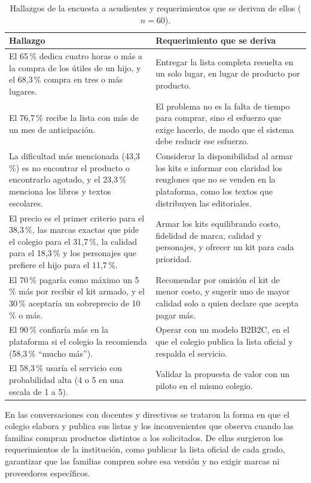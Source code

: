 \begin{table}[H]
\centering\footnotesize
\setlength{\tabcolsep}{4pt}
\renewcommand{\arraystretch}{1.25}
\caption{Hallazgos de la encuesta a acudientes y requerimientos que se derivan de ellos
($n=60$).}
\label{tab:encuesta-requerimientos}
\begin{tabularx}{\textwidth}{@{}XX@{}}
\toprule
\textbf{Hallazgo} & \textbf{Requerimiento que se deriva} \\
\midrule
El 65\,\% dedica cuatro horas o más a la compra de los útiles de un hijo, y el 68,3\,\%
compra en tres o más lugares. &
Entregar la lista completa resuelta en un solo lugar, en lugar de producto por producto. \\
El 76,7\,\% recibe la lista con más de un mes de anticipación. &
El problema no es la falta de tiempo para comprar, sino el esfuerzo que exige hacerlo, de
modo que el sistema debe reducir ese esfuerzo. \\
La dificultad más mencionada (43,3\,\%) es no encontrar el producto o encontrarlo agotado, y
el 23,3\,\% menciona los libros y textos escolares. &
Considerar la disponibilidad al armar los kits e informar con claridad los renglones que no
se venden en la plataforma, como los textos que distribuyen las editoriales. \\
El precio es el primer criterio para el 38,3\,\%, las marcas exactas que pide el colegio
para el 31,7\,\%, la calidad para el 18,3\,\% y los personajes que prefiere el hijo para el
11,7\,\%. &
Armar los kits equilibrando costo, fidelidad de marca, calidad y personajes, y ofrecer un
kit para cada prioridad. \\
El 70\,\% pagaría como máximo un 5\,\% más por recibir el kit armado, y el 30\,\% aceptaría
un sobreprecio de 10\,\% o más. &
Recomendar por omisión el kit de menor costo, y sugerir uno de mayor calidad solo a quien
declare que acepta pagar más. \\
El 90\,\% confiaría más en la plataforma si el colegio la recomienda (58,3\,\% ``mucho
más''). &
Operar con un modelo B2B2C, en el que el colegio publica la lista oficial y respalda el
servicio. \\
El 58,3\,\% usaría el servicio con probabilidad alta (4 o 5 en una escala de 1 a 5). &
Validar la propuesta de valor con un piloto en el mismo colegio. \\
\bottomrule
\end{tabularx}
\end{table}

En las conversaciones con docentes y directivos se trataron la forma en que el colegio
elabora y publica sus listas y los inconvenientes que observa cuando las familias compran
productos distintos a los solicitados. De ellas surgieron los requerimientos de la
institución, como publicar la lista oficial de cada grado, garantizar que las familias
compren sobre esa versión y no exigir marcas ni proveedores específicos.\par

